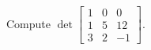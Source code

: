 \begin{applicationActivities}{2}{26}
%
%
%
%


\begin{activity}{5}
  Compute  $\det \begin{bmatrix} 1 & 0 & 0 \\ 1 & 5 & 12 \\ 3 & 2 & -1 \end{bmatrix}$.
\end{activity}


\end{applicationActivities}
